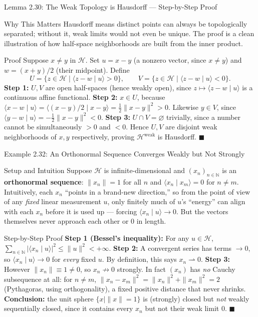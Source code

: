 \documentclass[aspectratio=169,10pt]{beamer}
\newcommand{\N}{\mathbb{N}}
\newcommand{\Hil}{\mathcal{H}}
\newcommand{\wto}{\rightharpoonup}
\newcommand{\ip}[2]{\langle #1 \mid #2 \rangle}
\begin{document}
\begin{frame}{Lemma 2.30: The Weak Topology is Hausdorff --- Step-by-Step Proof}
  \begin{block}{Why This Matters}
    Hausdorff means distinct points can always be topologically separated;
    without it, weak limits would not even be unique. The proof is a clean
    illustration of how half-space neighborhoods are built from the inner
    product.
  \end{block}

  \begin{block}{Proof}
    Suppose $x\ne y$ in $\Hil$. Set $u = x-y$ (a nonzero vector, since
    $x\ne y$) and $w=(x+y)/2$ (their midpoint). Define
    \[
      U = \{z\in\Hil \mid \ip{z-w}{u}>0\}, \qquad
      V = \{z\in\Hil \mid \ip{z-w}{u}<0\}.
    \]
    \textbf{Step 1:} $U,V$ are open half-spaces (hence weakly open), since
    $z\mapsto\ip{z-w}{u}$ is a continuous affine functional.
    \textbf{Step 2:} $x\in U$, because $\ip{x-w}{u} = \ip{(x-y)/2}{x-y} =
    \tfrac12\|x-y\|^2 > 0$. Likewise $y\in V$, since $\ip{y-w}{u} =
    -\tfrac12\|x-y\|^2<0$.
    \textbf{Step 3:} $U\cap V=\varnothing$ trivially, since a number cannot
    be simultaneously $>0$ and $<0$. Hence $U,V$ are disjoint weak
    neighborhoods of $x,y$ respectively, proving $\Hil^{\mathrm{weak}}$ is
    Hausdorff. $\blacksquare$
  \end{block}
\end{frame}

\begin{frame}{Example 2.32: An Orthonormal Sequence Converges Weakly but Not Strongly}
  \begin{block}{Setup and Intuition}
    Suppose $\Hil$ is infinite-dimensional and $(x_n)_{n\in\N}$ is an
    \textbf{orthonormal sequence}: $\|x_n\|=1$ for all $n$ and
    $\ip{x_n}{x_m}=0$ for $n\ne m$. Intuitively, each $x_n$ ``points in a
    brand-new direction,'' so from the point of view of any \emph{fixed}
    linear measurement $u$, only finitely much of $u$'s ``energy'' can align
    with each $x_n$ before it is used up --- forcing $\ip{x_n}{u}\to 0$. But
    the vectors themselves never approach each other or $0$ in length.
  \end{block}

  \begin{block}{Step-by-Step Proof}
    \textbf{Step 1 (Bessel's inequality):} For any $u\in\Hil$,
    $\sum_{n\in\N}|\ip{x_n}{u}|^2 \le \|u\|^2 < +\infty$.
    \textbf{Step 2:} A convergent series has terms $\to 0$, so
    $\ip{x_n}{u}\to 0$ for \emph{every} fixed $u$. By definition, this says
    $x_n\wto 0$.
    \textbf{Step 3:} However $\|x_n\|\equiv 1 \ne 0$, so $x_n\not\to 0$
    strongly. In fact $(x_n)$ has \emph{no} Cauchy subsequence at all: for
    $n\ne m$, $\|x_n-x_m\|^2 = \|x_n\|^2+\|x_m\|^2 = 2$ (Pythagoras, using
    orthogonality), a fixed positive distance that never shrinks.
    \textbf{Conclusion:} the unit sphere $\{x\mid\|x\|=1\}$ is (strongly)
    closed but \emph{not} weakly sequentially closed, since it contains
    every $x_n$ but not their weak limit $0$. $\blacksquare$
  \end{block}
\end{frame}
\end{document}
